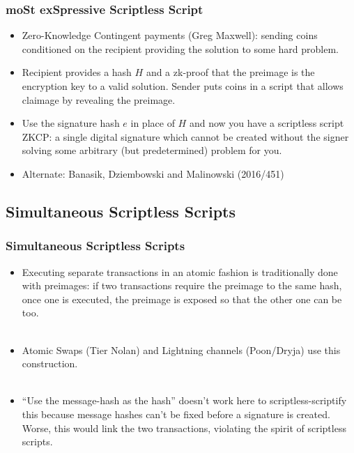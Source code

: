 \documentclass{beamer}
\begin{document}
\frame
{
  \frametitle{moSt exSpressive Scriptless Script}
  \begin{itemize}
  \item Zero-Knowledge Contingent payments (Greg Maxwell): sending coins conditioned
        on the recipient providing the solution to some hard problem.
  \item Recipient provides a hash $H$ and a zk-proof that the preimage
        is the encryption key to a valid solution. Sender puts coins in a script
        that allows claimage by revealing the preimage.
  \item Use the signature hash $e$ in place of $H$ and now you have a scriptless
        script ZKCP: a single digital signature which cannot be created without
        the signer solving some arbitrary (but predetermined) problem for you.
  \item Alternate: Banasik, Dziembowski and Malinowski (2016/451)
  \end{itemize}
}

\subsection{Simultaneous Scriptless Scripts}
\frame
{
  \frametitle{Simultaneous Scriptless Scripts}
  \begin{itemize}
  \item Executing separate transactions in an atomic fashion is traditionally
        done with preimages: if two transactions require the preimage to the
        same hash, once one is executed, the preimage is exposed so that the
        other one can be too.\\~\\
  \item Atomic Swaps (Tier Nolan) and Lightning channels (Poon/Dryja) use this construction.\\~\\
  \item ``Use the message-hash as the hash'' doesn't work here to scriptless-scriptify
        this because message hashes can't be fixed before a signature is created. Worse,
        this would link the two transactions,
        violating the spirit of scriptless scripts.
  \end{itemize}
}
\end{document}

